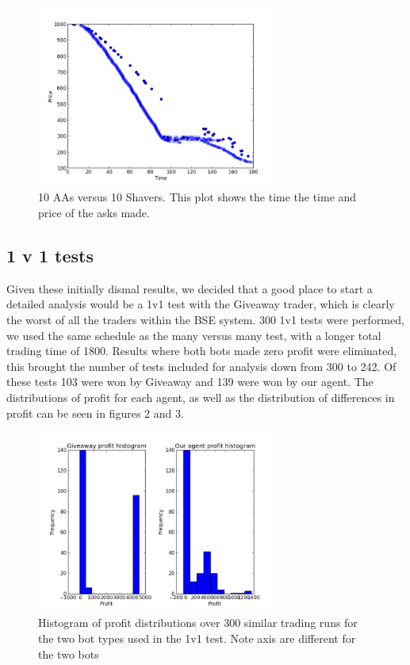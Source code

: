 \documentclass{acm_proc_article-sp}
\begin{document}
\begin{figure}[h!] \includegraphics[width=80mm]{SHVR10AA10_180_all_asks.png}
\caption {10 AAs versus 10 Shavers. This plot shows the time the time and price of the asks made.}
\end{figure}

\subsection{1 v 1 tests} Given these initially dismal results, we decided that
a good place to start a detailed analysis would be a 1v1 test with the Giveaway
trader, which is clearly the worst of all the traders within the BSE system.
300 1v1 tests were performed, we used the same schedule as the many versus many
test, with a longer total trading time of 1800. Results where both bots made
zero profit were eliminated, this brought the number of tests included for
analysis down from 300 to 242. Of these tests 103 were won by Giveaway and 139
were won by our agent. The distributions of profit for each agent, as well as
the distribution of differences in profit can be seen in figures 2 and 3.

\begin{figure}[h!] \includegraphics[width=80mm]{giveaway_1_v_1.png}
\caption{Histogram of profit distributions over 300 similar trading runs for
the two bot types used in the 1v1 test. Note axis are different for the two
bots} \end{figure}
\end{document}
